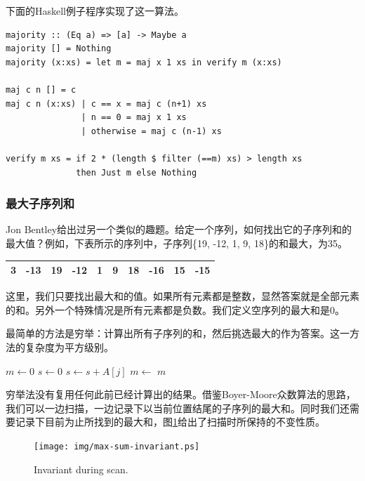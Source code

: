 \documentclass[UTF8]{article}
\begin{document}
下面的Haskell例子程序实现了这一算法。

\lstset{language=Haskell}
\begin{lstlisting}
majority :: (Eq a) => [a] -> Maybe a
majority [] = Nothing
majority (x:xs) = let m = maj x 1 xs in verify m (x:xs)

maj c n [] = c
maj c n (x:xs) | c == x = maj c (n+1) xs
               | n == 0 = maj x 1 xs
               | otherwise = maj c (n-1) xs

verify m xs = if 2 * (length $ filter (==m) xs) > length xs
              then Just m else Nothing
\end{lstlisting} %

\subsubsection{最大子序列和}

Jon Bentley给出过另一个类似的趣题\cite{programming-pearls}。给定一个序列，如何找出它的子序列和的最大值？例如，下表所示的序列中，子序列\{19, -12, 1, 9, 18\}的和最大，为35。

\begin{tabular}{|c|c|c|c|c|c|c|c|c|c|}
\hline
3 & -13 & 19 & -12 & 1 & 9 & 18 & -16 & 15 & -15 \\
\hline
\end{tabular}

这里，我们只要找出最大和的值。如果所有元素都是整数，显然答案就是全部元素的和。另外一个特殊情况是所有元素都是负数。我们定义空序列的最大和是0。

最简单的方法是穷举：计算出所有子序列的和，然后挑选最大的作为答案。这一方法的复杂度为平方级别。

\begin{algorithmic}[1]
  \State $m \gets 0$
    \State $s \gets 0$
      \State $s \gets s + A[j]$
      \State $m \gets $ 
    \EndFor
  \EndFor
  \State \Return $m$
\EndFunction
\end{algorithmic}

穷举法没有复用任何此前已经计算出的结果。借鉴Boyer-Moore众数算法的思路，我们可以一边扫描，一边记录下以当前位置结尾的子序列的最大和。同时我们还需要记录下目前为止所找到的最大和，图\ref{fig:max-sum-invariant}给出了扫描时所保持的不变性质。

\begin{figure}[htbp]
 \centering
 \texttt{[image: img/max-sum-invariant.ps]}
 \caption{Invariant during scan.}
 \label{fig:max-sum-invariant}
\end{figure}
\end{document}
